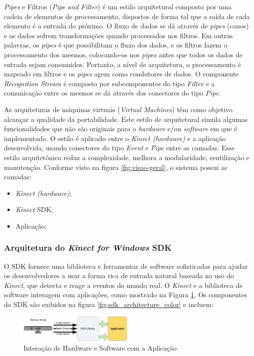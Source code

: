 \textit{Pipes} e Filtros (\textit{Pipe and Filter}) é um estilo arquitetural composto por uma cadeia de elementos de processamento, dispostos de forma tal que a saída de cada elemento é a entrada do próximo. O fluxo de dados se dá através de \textit{pipes} (canos) e os dados sofrem transformações quando processados nos filtros. Em outras palavras, os \textit{pipes} é que possibilitam o fluxo dos dados, e os filtros fazem o processamento dos mesmos, colocando-os nos \textit{pipes} antes que todos os dados de entrada sejam consumidos. Portanto, a nível de arquitetura, o processamento é mapeado em filtros e os \textit{pipes} agem como condutores de dados. O componente \textit{Recognition Stream} é composto por subcomponentes do tipo \textit{Filter} e a comunicação entre os mesmos se dá através dos conectores do tipo \textit{Pipe}. 

As arquiteturas de máquinas virtuais (\textit{Virtual Machines}) têm como objetivo alcançar a qualidade da portabilidade. Este estilo de arquitetural simula algumas funcionalidades que não são originais para o \textit{hardware} e/ou \textit{software} em que é implementado. O estilo é aplicado entre o \textit{Kinect (hardware)} e a aplicação desenvolvida, usando conectores do tipo \textit{Event} e \textit{Pipe} entre as camadas. Esse estilo arquitetônico reduz a complexidade, melhora a modularidade, reutilização e manutenção.
Conforme visto na figura \ref{fig:visao-geral}, o sistema possui as camadas:

\begin{itemize}
\item \textit{Kinect (hardware)};
\item \textit{Kinect} SDK; 
\item Aplicação; 
\end{itemize}

\subsubsection{Arquitetura do \textit{Kinect for Windows} SDK}\label{sec:kinectSDK}
O SDK fornece uma biblioteca e ferramentas de software sofisticadas para ajudar os desenvolvedores a usar a forma rica de entrada natural baseada no uso do \textit{Kinect}, que detecta e reage a eventos do mundo real. O \textit{Kinect} e a biblioteca de software interagem com aplicações, como mostrado na Figura \ref{fig:sdk_interact}. Os componentes do SDK são exibidos na figura \ref{fig:sdk_architecture_color} e incluem:

\begin{figure}[ht]
\centering
\includegraphics[width=0.5\textwidth]{images/sdk_interaction.png}
\caption{Interação de Hardware e Software com a Aplicação}
\label{fig:sdk_interact}
\end{figure}




